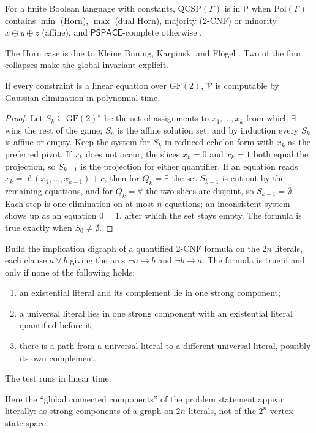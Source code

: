 \documentclass[final]{siamart0516}
\numberwithin{theorem}{section}
\numberwithin{equation}{section}
\theoremstyle{siamnonum}
\theoremstyle{plain}
\newcommand{\val}{\mathcal{V}}            %
\newcommand{\cls}[1]{\mathsf{#1}}
\newcommand{\PSPACE}{\cls{PSPACE}}
\newcommand{\Pclass}{\cls{P}}
\begin{document}
\begin{theorem}\label{thm:schaefer}
For a finite Boolean language with constants, $\mathrm{QCSP}(\Gamma)$ is in $\Pclass$ when $\mathrm{Pol}(\Gamma)$ contains $\min$ (Horn), $\max$ (dual Horn), majority (2-CNF) or minority $x\oplus y\oplus z$ (affine), and $\PSPACE$-complete otherwise \cite{SchaeferSAT,CKS01}.
\end{theorem}
The Horn case is due to Kleine B\"uning, Karpinski and Fl\"ogel \cite{KBKF}. Two of the four collapses make the global invariant explicit.

\begin{proposition}\label{prop:affine}
If every constraint is a linear equation over $\mathrm{GF}(2)$, $\val$ is computable by Gaussian elimination in polynomial time.
\end{proposition}
\begin{proof}
Let $S_k\subseteq\mathrm{GF}(2)^k$ be the set of assignments to $x_1,\dots,x_k$ from which $\exists$ wins the rest of the game; $S_n$ is the affine solution set, and by induction every $S_k$ is affine or empty. Keep the system for $S_k$ in reduced echelon form with $x_k$ as the preferred pivot. If $x_k$ does not occur, the slices $x_k=0$ and $x_k=1$ both equal the projection, so $S_{k-1}$ is the projection for either quantifier. If an equation reads $x_k=\ell(x_1,\dots,x_{k-1})+c$, then for $Q_k=\exists$ the set $S_{k-1}$ is cut out by the remaining equations, and for $Q_k=\forall$ the two slices are disjoint, so $S_{k-1}=\emptyset$. Each step is one elimination on at most $n$ equations; an inconsistent system shows up as an equation $0=1$, after which the set stays empty. The formula is true exactly when $S_0\ne\emptyset$.
\end{proof}

\begin{theorem}\label{thm:apt}
Build the implication digraph of a quantified 2-CNF formula on the $2n$ literals, each clause $a\lor b$ giving the arcs $\neg a\to b$ and $\neg b\to a$. The formula is true if and only if none of the following holds:
\begin{enumerate}[label=\textup{(\arabic*)}]
\item an existential literal and its complement lie in one strong component;
\item a universal literal lies in one strong component with an existential literal quantified before it;
\item there is a path from a universal literal to a different universal literal, possibly its own complement.
\end{enumerate}
The test runs in linear time.
\end{theorem}
Here the ``global connected components'' of the problem statement appear literally: as strong components of a graph on $2n$ literals, not of the $2^n$-vertex state space.
\end{document}
